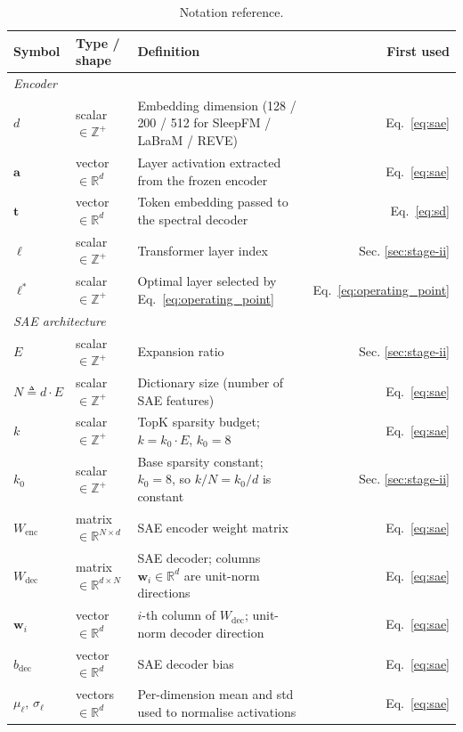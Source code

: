 \documentclass{article}
\begin{document}
\begin{table}[h]
\centering
\small
\caption{Notation reference.}
\begin{tabular}{lllr}
\toprule
\textbf{Symbol} & \textbf{Type / shape} & \textbf{Definition} & \textbf{First used} \\
\midrule
\multicolumn{4}{l}{\textit{Encoder}} \\
$d$ & scalar $\in \mathbb{Z}^+$ & Embedding dimension (128 / 200 / 512 for SleepFM / LaBraM / REVE) & Eq.~\ref{eq:sae} \\
$\mathbf{a}$ & vector $\in \mathbb{R}^d$ & Layer activation extracted from the frozen encoder & Eq.~\ref{eq:sae} \\
$\mathbf{t}$ & vector $\in \mathbb{R}^d$ & Token embedding passed to the spectral decoder & Eq.~\ref{eq:sd} \\
$\ell$ & scalar $\in \mathbb{Z}^+$ & Transformer layer index & Sec. \ref{sec:stage-ii} \\
$\ell^*$ & scalar $\in \mathbb{Z}^+$ & Optimal layer selected by Eq.~\ref{eq:operating_point} & Eq.~\ref{eq:operating_point} \\
\midrule
\multicolumn{4}{l}{\textit{SAE architecture}} \\
$E$ & scalar $\in \mathbb{Z}^+$ & Expansion ratio & Sec. \ref{sec:stage-ii} \\
$N \triangleq d \cdot E$ & scalar $\in \mathbb{Z}^+$ & Dictionary size (number of SAE features) & Eq.~\ref{eq:sae} \\
$k$ & scalar $\in \mathbb{Z}^+$ & TopK sparsity budget; $k = k_0 \cdot E$, $k_0 = 8$ & Eq.~\ref{eq:sae} \\
$k_0$ & scalar $\in \mathbb{Z}^+$ & Base sparsity constant; $k_0=8$, so $k/N = k_0/d$ is constant & Sec. \ref{sec:stage-ii} \\
$W_{\text{enc}}$ & matrix $\in \mathbb{R}^{N \times d}$ & SAE encoder weight matrix & Eq.~\ref{eq:sae} \\
$W_{\text{dec}}$ & matrix $\in \mathbb{R}^{d \times N}$ & SAE decoder; columns $\mathbf{w}_i \in \mathbb{R}^d$ are unit-norm directions & Eq.~\ref{eq:sae} \\
$\mathbf{w}_i$ & vector $\in \mathbb{R}^d$ & $i$-th column of $W_{\text{dec}}$; unit-norm decoder direction & Eq.~\ref{eq:sae} \\
$b_{\text{dec}}$ & vector $\in \mathbb{R}^d$ & SAE decoder bias & Eq.~\ref{eq:sae} \\
$\mu_\ell,\,\sigma_\ell$ & vectors $\in \mathbb{R}^d$ & Per-dimension mean and std used to normalise activations & Eq.~\ref{eq:sae} \\

\end{tabular}
\end{table}
\end{document}
